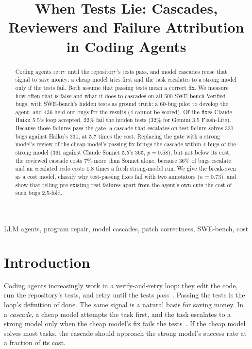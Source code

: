 \documentclass[10pt,conference]{IEEEtran}
\begin{document}
\title{When Tests Lie: Cascades, Reviewers and Failure Attribution in Coding Agents}

\author{
}

\maketitle

\begin{abstract}
Coding agents retry until the repository's tests pass, and model cascades reuse that signal to save money: a cheap
model tries first and the task escalates to a strong model only if the tests fail. Both assume that passing tests
mean a correct fix. We measure how often that is false and what it does to cascades on all 500 SWE-bench Verified
bugs, with SWE-bench's hidden tests as ground truth: a 60-bug pilot to develop the agent, and 436 held-out bugs for
the results (4 cannot be scored). Of the fixes Claude Haiku 5.5's loop
accepted, 22\% fail the hidden tests (32\% for Gemini 3.5 Flash-Lite). Because those failures pass the gate, a
cascade that escalates on test failure solves 331 bugs against Haiku's 330, at 5.7 times the cost. Replacing the
gate with a strong model's review of the cheap model's passing fix brings the cascade within 4 bugs of the strong
model (361 against Claude Sonnet 5.5's 365, $p=0.58$), but not below its cost: the reviewed cascade costs 7\% more than Sonnet alone, because
36\% of bugs escalate and an escalated redo costs 1.8 times a fresh strong-model run. We give the break-even as a cost
model, classify why test-passing fixes fail with two annotators ($\kappa=0.73$), and show that telling pre-existing
test failures apart from the agent's own cuts the cost of such bugs 2.5-fold.
\end{abstract}

\begin{IEEEkeywords}
LLM agents, program repair, model cascades, patch correctness, SWE-bench, cost
\end{IEEEkeywords}

\section{Introduction}
Coding agents increasingly work in a verify-and-retry loop: they edit the code, run the repository's tests, and
retry until the tests pass~\cite{swebench}. Passing the tests is the loop's definition of done. The same signal is a
natural basis for saving money. In a \emph{cascade}, a cheap model attempts the task first, and the task escalates
to a strong model only when the cheap model's fix fails the tests~\cite{frugalgpt,kapoor2024}. If the cheap model
solves most tasks, the cascade should approach the strong model's success rate at a fraction of its cost.
\end{document}
